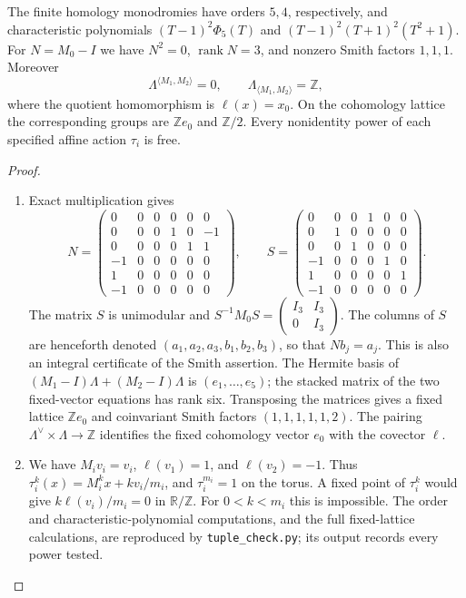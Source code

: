 \begin{theorem}\label{night:P1.1}
The finite homology monodromies have orders $5,4$, respectively, and
characteristic polynomials
$(T-1)^2\Phi _5(T)$ and $(T-1)^2(T+1)^2(T^2+1)$.
For $N=M_0-I$ we have $N^2=0$, $\operatorname{rank}N=3$, and
nonzero Smith factors $1,1,1$.  Moreover
\[
 \Lambda^{\langle M_1,M_2\rangle}=0,\qquad
 \Lambda_{\langle M_1,M_2\rangle}=\mathbb Z,
\]
where the quotient homomorphism is $\ell(x)=x_0$.
On the cohomology lattice the corresponding groups are $\mathbb Ze_0$
and $\mathbb Z/2$.  Every nonidentity power of each specified affine
action $\tau_i$ is free.
\end{theorem}
\begin{proof}
\begin{enumerate}[label=\arabic*.]
\item Exact multiplication gives
\[
N=\begin{pmatrix}
0&0&0&0&0&0\\0&0&0&1&0&-1\\0&0&0&0&1&1\\
-1&0&0&0&0&0\\1&0&0&0&0&0\\-1&0&0&0&0&0
\end{pmatrix},\qquad
S=\begin{pmatrix}
0&0&0&1&0&0\\0&1&0&0&0&0\\0&0&1&0&0&0\\
-1&0&0&0&1&0\\1&0&0&0&0&1\\-1&0&0&0&0&0
\end{pmatrix}.
\]
The matrix $S$ is unimodular and
$S^{-1}M_0S=\left(\begin{smallmatrix}I_3&I_3\\0&I_3\end{smallmatrix}\right)$.
The columns of $S$ are henceforth denoted
$(a_1,a_2,a_3,b_1,b_2,b_3)$, so that $Nb_j=a_j$.
This is also an integral certificate of the Smith assertion.
The Hermite basis of
$(M_1-I)\Lambda+(M_2-I)\Lambda$ is $(e_1,\ldots,e_5)$;
the stacked matrix of the two fixed-vector equations has rank six.
Transposing the matrices gives a fixed lattice $\mathbb Ze_0$ and
coinvariant Smith factors $(1,1,1,1,1,2)$.  The pairing
$\Lambda^\vee\times\Lambda\longrightarrow\mathbb Z$ identifies the
fixed cohomology vector $e_0$ with the covector $\ell$.

\item We have $M_iv_i=v_i$, $\ell(v_1)=1$, and $\ell(v_2)=-1$.
Thus $\tau_i^k(x)=M_i^kx+kv_i/m_i$, and $\tau_i^{m_i}=1$ on the
torus.  A fixed point of $\tau_i^k$ would give
$k\ell(v_i)/m_i=0$ in $\mathbb R/\mathbb Z$.  For
$0<k<m_i$ this is impossible.  The order and characteristic-polynomial
computations, and the full fixed-lattice calculations, are reproduced by
\texttt{tuple\_check.py}; its output records every power tested.

\end{enumerate}
\end{proof}





